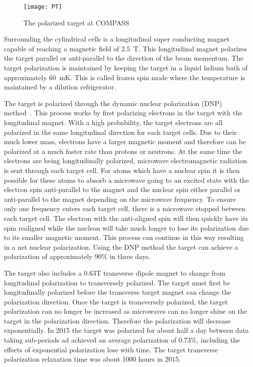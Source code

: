 \begin{figure}[h!t]
  \centering
  \texttt{[image: PT]}
  \caption{The polarized target at COMPASS}
  \label{fig::PT}
\end{figure}

Surrounding the cylindrical cells is a longitudinal super conducting magnet
capable of reaching a magnetic field of 2.5~T.  This longitudinal magnet
polarizes the target parallel or anti-parallel to the direction of the beam
momentum.  The target polarization is maintained by keeping the target in a
liquid helium bath of approximately 60~mK.  This is called frozen spin mode
where the temperature is maintained by a dilution refrigerator. \par

The target is polarized through the dynamic nuclear polarization (DNP)
method~\cite{DNPmethod}.  This process works by first polarizing electrons in
the target with the longitudinal magnet.  With a high probability, the target
electrons are all polarized in the same longitudinal direction for each target
cells.  Due to their much lower mass, electrons have a larger magnetic moment
and therefore can be polarized at a much faster rate than protons or neutrons.
At the same time the electrons are being longitudinally polarized, microwave
electromagnetic radiation is sent through each target cell.  For atoms which
have a nuclear spin it is then possible for these atoms to absorb a microwave
going to an excited state with the electron spin anti-parallel to the magnet and
the nuclear spin either parallel or anti-parallel to the magnet depending on the
microwave frequency.  To ensure only one frequency enters each target cell,
there is a microwave stopped between each target cell.  The electron with the
anti-aligned spin will then quickly have its spin realigned while the nucleon
will take much longer to lose its polarization due to its smaller magnetic
moment.  This process can continue in this way resulting in a net nuclear
polarization.  Using the DNP method the target can achieve a polarization of
approximately 90\% in three days. \par

The target also includes a 0.63T transverse dipole magnet to change from
longitudinal polarization to transversely polarized.  The target must first be
longitudinally polarized before the transverse target magnet can change the
polarization direction.  Once the target is transversely polarized, the target
polarization can no longer be increased as microwaves can no longer shine on the
target in the polarization direction.  Therefore the polarization will decrease
exponentially.  In 2015 the target was polarized for about half a day between
data taking sub-periods ad achieved an average polarization of 0.73\%, including
the effects of exponential polarization lose with time.  The target transverse
polarization relaxation time was about 1000 hours in 2015. \par

